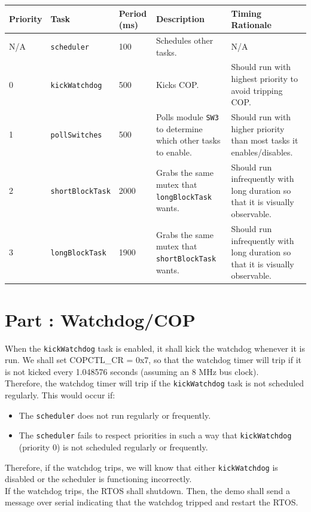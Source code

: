 \documentclass{article}
\newcounter{partNum}
\newcommand{\partNum}{%
        \stepcounter{partNum}%
        \thepartNum}
\newcommand{\sectPart}[1]{\section*{Part \partNum: #1}}
\begin{document}
\begin{center}
    \begin{tabular}{|l|l|l|p{10em}|p{10em}|}
        \hline
        \textbf{Priority} & \textbf{Task} & \textbf{Period (ms)} & \textbf{Description} & \textbf{Timing Rationale} \\ \hline
        N/A & \texttt{scheduler} & 100 & Schedules other tasks. & N/A \\ \hline
        0 & \texttt{kickWatchdog} & 500 & Kicks COP. & Should run with highest priority to avoid tripping COP. \\ \hline
        1 & \texttt{pollSwitches} & 500 & Polls module \texttt{SW3} to determine which other tasks to enable. & Should run with higher priority than most tasks it enables/disables. \\ \hline
        2 & \texttt{shortBlockTask} & 2000 & Grabs the same mutex that \texttt{longBlockTask} wants. & Should run infrequently with long duration so that it is visually observable. \\ \hline
        3 & \texttt{longBlockTask} & 1900 & Grabs the same mutex that \texttt{shortBlockTask} wants. & Should run infrequently with long duration so that it is visually observable. \\ \hline
    \end{tabular}
\end{center}


\newpage

\sectPart{Watchdog/COP}

When the \texttt{kickWatchdog} task is enabled, it shall kick the watchdog whenever it is run. We shall set COPCTL\_CR = 0x7, so that the watchdog timer will trip if it is not kicked every 1.048576 seconds (assuming an 8 MHz bus clock). \\
Therefore, the watchdog timer will trip if the \texttt{kickWatchdog} task is not scheduled regularly. This would occur if:
    \begin{itemize}
        \item The \texttt{scheduler} does not run regularly or frequently.
        \item The \texttt{scheduler} fails to respect priorities in such a way that \texttt{kickWatchdog} (priority 0) is not scheduled regularly or frequently.
    \end{itemize}
Therefore, if the watchdog trips, we will know that either \texttt{kickWatchdog} is disabled or the scheduler is functioning incorrectly. \\
If the watchdog trips, the RTOS shall shutdown. Then, the demo shall send a message over serial indicating that the watchdog tripped and restart the RTOS.
\end{document}
